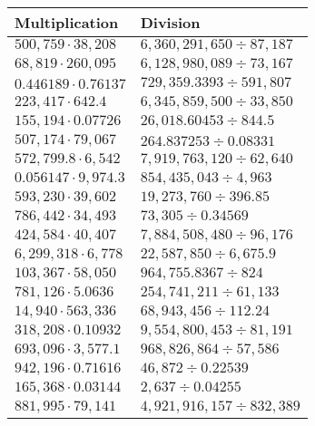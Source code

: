 \begin{longtable}[]{@{}ll@{}}
\toprule
Multiplication & Division\tabularnewline
\midrule
\endhead
\(500,759\cdot38,208\) & \(6,360,291,650÷87,187\)\tabularnewline
\(68,819\cdot260,095\) & \(6,128,980,089÷73,167\)\tabularnewline
\(0.446189\cdot0.76137\) & \(729,359.3393÷591,807\)\tabularnewline
\(223,417\cdot642.4\) & \(6,345,859,500÷33,850\)\tabularnewline
\(155,194\cdot0.07726\) & \(26,018.60453÷844.5\)\tabularnewline
\(507,174\cdot79,067\) & \(264.837253÷0.08331\)\tabularnewline
\(572,799.8\cdot6,542\) & \(7,919,763,120÷62,640\)\tabularnewline
\(0.056147\cdot9,974.3\) & \(854,435,043÷4,963\)\tabularnewline
\(593,230\cdot39,602\) & \(19,273,760÷396.85\)\tabularnewline
\(786,442\cdot34,493\) & \(73,305÷0.34569\)\tabularnewline
\(424,584\cdot40,407\) & \(7,884,508,480÷96,176\)\tabularnewline
\(6,299,318\cdot6,778\) & \(22,587,850÷6,675.9\)\tabularnewline
\(103,367\cdot58,050\) & \(964,755.8367÷824\)\tabularnewline
\(781,126\cdot5.0636\) & \(254,741,211÷61,133\)\tabularnewline
\(14,940\cdot563,336\) & \(68,943,456÷112.24\)\tabularnewline
\(318,208\cdot0.10932\) & \(9,554,800,453÷81,191\)\tabularnewline
\(693,096\cdot3,577.1\) & \(968,826,864÷57,586\)\tabularnewline
\(942,196\cdot0.71616\) & \(46,872÷0.22539\)\tabularnewline
\(165,368\cdot0.03144\) & \(2,637÷0.04255\)\tabularnewline
\(881,995\cdot79,141\) & \(4,921,916,157÷832,389\)\tabularnewline
\bottomrule
\end{longtable}
